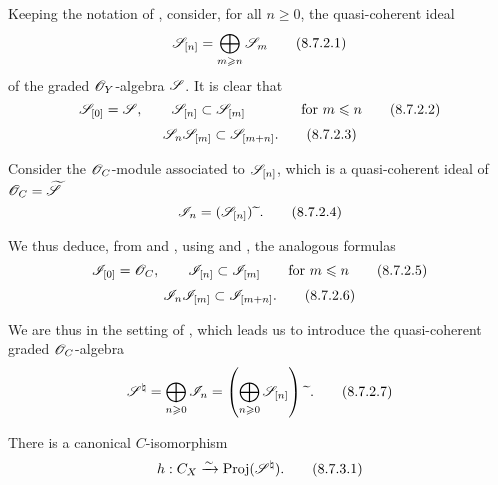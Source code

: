\begin{env}[8.7.2]
\label{II.8.7.2}
Keeping the notation of , consider, for all $n\geq0$, the quasi-coherent ideal
\[
\label{II.8.7.2.1}
  \mathscr{S}_{[n]} = \bigoplus_{m\geqslant n}\mathscr{S}_m
\tag{8.7.2.1}
\]
of the graded $\mathscr{O}_Y$-algebra $\mathscr{S}$.
It is clear that
\[
\label{II.8.7.2.2}
  \mathscr{S}_{[0]} = \mathscr{S},
  \qquad
  \mathscr{S}_{[n]} \subset \mathscr{S}_{[m]}
  \qquad\qquad
  \mbox{for $m\leqslant n$}
\tag{8.7.2.2}
\]
\[
\label{II.8.7.2.3}
  \mathscr{S}_{n} \mathscr{S}_{[m]} \subset \mathscr{S}_{[m+n]}.
\tag{8.7.2.3}
\]

Consider the $\mathscr{O}_C$-module associated to $\mathscr{S}_{[n]}$, which is a quasi-coherent ideal of $\mathscr{O}_C = \widetilde{\mathscr{S}}$ 
\[
\label{II.8.7.2.4}
  \mathscr{I}_n = (\mathscr{S}_{[n]}){\,\widetilde{\,}\,}.
\tag{8.7.2.4}
\]

We thus deduce, from  and , using  and , the analogous formulas
\[
\label{II.8.7.2.5}
  \mathscr{I}_{[0]} = \mathscr{O}_C,
  \qquad
  \mathscr{I}_{[n]} \subset \mathscr{I}_{[m]}
  \qquad
  \text{for }m\leqslant n
\tag{8.7.2.5}
\]
\[
\label{II.8.7.2.6}
  \mathscr{I}_{n} \mathscr{I}_{[m]} \subset \mathscr{I}_{[m+n]}.
\tag{8.7.2.6}
\]

We are thus in the setting of , which leads us to introduce the quasi-coherent graded $\mathscr{O}_C$-algebra
\[
\label{II.8.7.2.7}
  \mathscr{S}^\natural
  =
  \bigoplus_{n\geqslant0}\mathscr{I}_n
  =
  \left(
    \bigoplus_{n\geqslant0} \mathscr{S}_{[n]}
  \right){\,\widetilde{\,}\,}.
\tag{8.7.2.7}
\]
\end{env}

\begin{proposition}[8.7.3]
\label{II.8.7.3}
There is a canonical $C$-isomorphism
\[
\label{II.8.7.3.1}
  h: C_X \xrightarrow{\sim} \operatorname{Proj}(\mathscr{S}^\natural).
\tag{8.7.3.1}
\]
\end{proposition}

